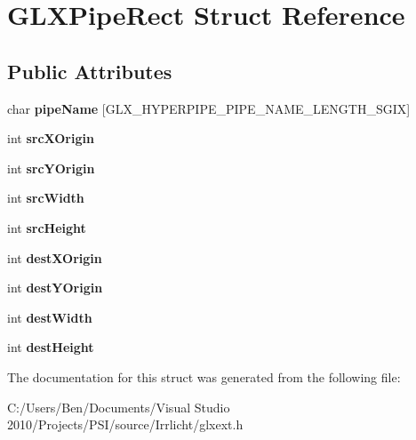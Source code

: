 \hypertarget{struct_g_l_x_pipe_rect}{\section{G\-L\-X\-Pipe\-Rect Struct Reference}
\label{struct_g_l_x_pipe_rect}
}
\subsection*{Public Attributes}
\begin{DoxyCompactItemize}
\item 
\hypertarget{struct_g_l_x_pipe_rect_aa4c4f60e9647705ddefa10f95a37cb79}{char {\bfseries pipe\-Name} \mbox{[}G\-L\-X\-\_\-\-H\-Y\-P\-E\-R\-P\-I\-P\-E\-\_\-\-P\-I\-P\-E\-\_\-\-N\-A\-M\-E\-\_\-\-L\-E\-N\-G\-T\-H\-\_\-\-S\-G\-I\-X\mbox{]}}\label{struct_g_l_x_pipe_rect_aa4c4f60e9647705ddefa10f95a37cb79}

\item 
\hypertarget{struct_g_l_x_pipe_rect_a9df2313c01f75d149e64f2ff467bc266}{int {\bfseries src\-X\-Origin}}\label{struct_g_l_x_pipe_rect_a9df2313c01f75d149e64f2ff467bc266}

\item 
\hypertarget{struct_g_l_x_pipe_rect_a1f7316dff7050ab2ce9d3d37f8c5450e}{int {\bfseries src\-Y\-Origin}}\label{struct_g_l_x_pipe_rect_a1f7316dff7050ab2ce9d3d37f8c5450e}

\item 
\hypertarget{struct_g_l_x_pipe_rect_a2c6c180a4dabb71076366e06a1c7d0ef}{int {\bfseries src\-Width}}\label{struct_g_l_x_pipe_rect_a2c6c180a4dabb71076366e06a1c7d0ef}

\item 
\hypertarget{struct_g_l_x_pipe_rect_a35632524bce6bffa05f284a9b1c1b8ff}{int {\bfseries src\-Height}}\label{struct_g_l_x_pipe_rect_a35632524bce6bffa05f284a9b1c1b8ff}

\item 
\hypertarget{struct_g_l_x_pipe_rect_a8b7b941894ad3420326d7e9fa885bb71}{int {\bfseries dest\-X\-Origin}}\label{struct_g_l_x_pipe_rect_a8b7b941894ad3420326d7e9fa885bb71}

\item 
\hypertarget{struct_g_l_x_pipe_rect_aef7766b02ef07c20a11e89da5878b469}{int {\bfseries dest\-Y\-Origin}}\label{struct_g_l_x_pipe_rect_aef7766b02ef07c20a11e89da5878b469}

\item 
\hypertarget{struct_g_l_x_pipe_rect_a3c07991d2a8fb6e973eae834650b3dad}{int {\bfseries dest\-Width}}\label{struct_g_l_x_pipe_rect_a3c07991d2a8fb6e973eae834650b3dad}

\item 
\hypertarget{struct_g_l_x_pipe_rect_a858b0ea6642e451495aff35cfefbd083}{int {\bfseries dest\-Height}}\label{struct_g_l_x_pipe_rect_a858b0ea6642e451495aff35cfefbd083}

\end{DoxyCompactItemize}


The documentation for this struct was generated from the following file\-:\begin{DoxyCompactItemize}
\item 
C\-:/\-Users/\-Ben/\-Documents/\-Visual Studio 2010/\-Projects/\-P\-S\-I/source/\-Irrlicht/glxext.\-h\end{DoxyCompactItemize}
